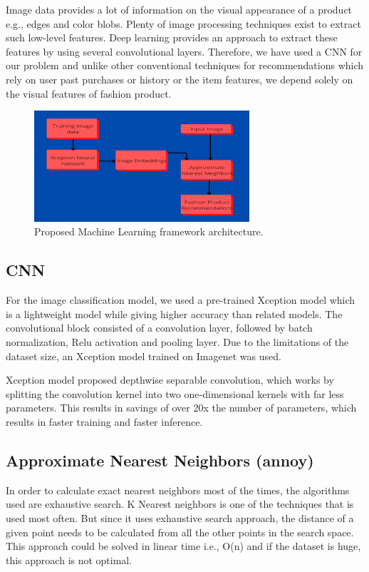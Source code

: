 \documentclass[12pt,twocolumn,letterpaper,Times New Roman]{article}
\begin{document}
Image data provides a lot of information on the visual appearance of a product e.g., edges and color blobs.\cite{prince2012computer} Plenty of image processing techniques exist to extract such low-level features. Deep learning provides an approach to extract these features by using several convolutional layers\cite{Zhang_2020}. Therefore, we have used a CNN for our problem and unlike other conventional techniques for recommendations which rely on user past purchases or history or the item features, we depend solely on the visual features of fashion product.

\begin{figure}[!ht]
    \centering
    \includegraphics[width=80mm]{fig_7.png}
    \caption{Proposed Machine Learning framework architecture.}
    \label{fig:10}
\end{figure}


\subsection{CNN}
For the image classification model, we used a pre-trained Xception model which is a lightweight model while giving higher accuracy than related models. The convolutional block consisted of a convolution layer, followed by batch normalization, Relu activation and pooling layer. Due to the limitations of the dataset size, an Xception model trained on Imagenet was used.

Xception model proposed depthwise separable convolution, which works by splitting the convolution kernel into two one-dimensional kernels with far less parameters. This results in savings of over 20x the number of parameters, which results in faster training and faster inference.

\subsection{Approximate Nearest Neighbors (annoy)}
In order to calculate exact nearest neighbors most of the times, the algorithms used are exhaustive search. K Nearest neighbors is one of the techniques that is used most often. But since it uses exhaustive search approach, the distance of a given point needs to be calculated from all the other points in the search space. This approach could be solved in linear time i.e., O(n) and if the dataset is huge, this approach is not optimal.
\end{document}
